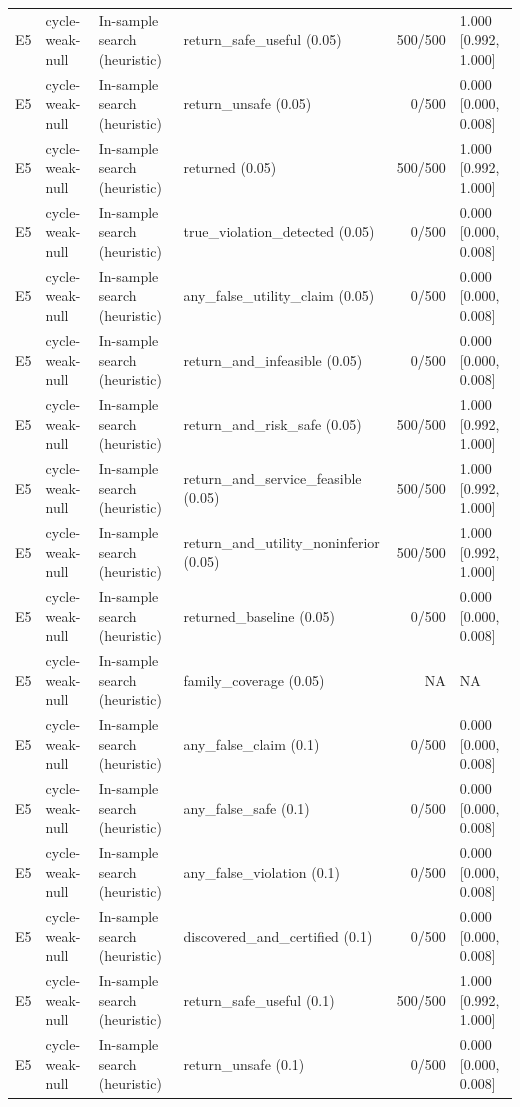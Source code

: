 \begin{longtable}{p{.04\linewidth}p{.18\linewidth}p{.19\linewidth}p{.16\linewidth}r p{.21\linewidth}}
E5 & cycle-weak-null & In-sample search (heuristic) & return\_safe\_useful (0.05) & 500/500 & 1.000 [0.992, 1.000]\\
E5 & cycle-weak-null & In-sample search (heuristic) & return\_unsafe (0.05) & 0/500 & 0.000 [0.000, 0.008]\\
E5 & cycle-weak-null & In-sample search (heuristic) & returned (0.05) & 500/500 & 1.000 [0.992, 1.000]\\
E5 & cycle-weak-null & In-sample search (heuristic) & true\_violation\_detected (0.05) & 0/500 & 0.000 [0.000, 0.008]\\
E5 & cycle-weak-null & In-sample search (heuristic) & any\_false\_utility\_claim (0.05) & 0/500 & 0.000 [0.000, 0.008]\\
E5 & cycle-weak-null & In-sample search (heuristic) & return\_and\_infeasible (0.05) & 0/500 & 0.000 [0.000, 0.008]\\
E5 & cycle-weak-null & In-sample search (heuristic) & return\_and\_risk\_safe (0.05) & 500/500 & 1.000 [0.992, 1.000]\\
E5 & cycle-weak-null & In-sample search (heuristic) & return\_and\_service\_feasible (0.05) & 500/500 & 1.000 [0.992, 1.000]\\
E5 & cycle-weak-null & In-sample search (heuristic) & return\_and\_utility\_noninferior (0.05) & 500/500 & 1.000 [0.992, 1.000]\\
E5 & cycle-weak-null & In-sample search (heuristic) & returned\_baseline (0.05) & 0/500 & 0.000 [0.000, 0.008]\\
E5 & cycle-weak-null & In-sample search (heuristic) & family\_coverage (0.05) & NA & NA\\
E5 & cycle-weak-null & In-sample search (heuristic) & any\_false\_claim (0.1) & 0/500 & 0.000 [0.000, 0.008]\\
E5 & cycle-weak-null & In-sample search (heuristic) & any\_false\_safe (0.1) & 0/500 & 0.000 [0.000, 0.008]\\
E5 & cycle-weak-null & In-sample search (heuristic) & any\_false\_violation (0.1) & 0/500 & 0.000 [0.000, 0.008]\\
E5 & cycle-weak-null & In-sample search (heuristic) & discovered\_and\_certified (0.1) & 0/500 & 0.000 [0.000, 0.008]\\
E5 & cycle-weak-null & In-sample search (heuristic) & return\_safe\_useful (0.1) & 500/500 & 1.000 [0.992, 1.000]\\
E5 & cycle-weak-null & In-sample search (heuristic) & return\_unsafe (0.1) & 0/500 & 0.000 [0.000, 0.008]\\

\end{longtable}
